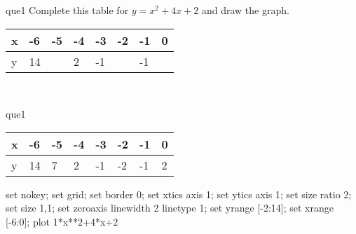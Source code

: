\documentclass[13.5pt, varwidth=true]{beamer}
\begin{document}
\begin{frame}[shrink=19,fragile]
	\begin{beamercolorbox}[rounded=true, left, shadow=true,wd=14.8cm]{que1}
		 Complete this table for $y = x^{2} + 4x + 2$ and draw the graph. \\[0.3cm] \renewcommand{\arraystretch}{1.2}\begin{tabular}{|C|C|C|C|C|C|C|C|} \hline x & -6 & -5 & -4 & -3 & -2 & -1 & 0 \\ \hline y & 14 &  & 2 & -1 &  & -1 & \\ \hline \end{tabular}\\[0.3cm]
	\end{beamercolorbox}
\end{frame}
\begin{frame}[shrink=19,fragile]
	\begin{beamercolorbox}[rounded=true, left, shadow=true,wd=14.8cm]{que1}
		\renewcommand{\arraystretch}{1.2}\begin{tabular}{|C|C|C|C|C|C|C|C|} \hline x & -6 & -5 & -4 & -3 & -2 & -1 & 0 \\ \hline y & 14 & 7 & 2 & -1 & -2 & -1 & 2\\ \hline \end{tabular}\begin{gnuplot}[terminal=pdf] set nokey; set grid; set border 0; set xtics axis 1; set ytics axis 1; set size ratio 2; set size 1,1; set zeroaxis linewidth 2 linetype 1; set yrange [-2:14]; set xrange [-6:0]; plot 1*x**2+4*x+2 \end{gnuplot}
	\end{beamercolorbox}
\end{frame}
\end{document}
